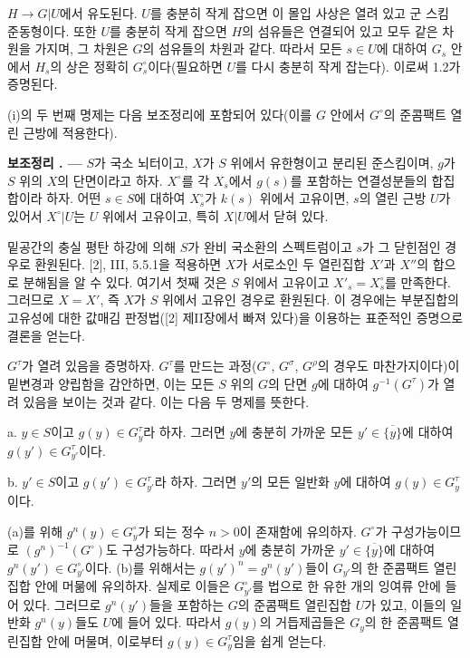\documentclass[11pt,twoside,openany]{book}
\numberwithin{equation}{section}
\newcommand{\sourceunit}{front}
\newcommand{\src}[1]{%
  \phantomsection\hypertarget{src:\sourceunit:#1}{}%
  \marginpar{\raggedleft\footnotesize\sffamily #1}%
}
\theoremstyle{plain}
\theoremstyle{definition}
\theoremstyle{remark}
\newcommand{\result}[2]{%
  \par\medskip\noindent\textbf{#1%
  \if\relax\detokenize{#2}\relax\else\space#2\fi. ---}\enspace
}
\begin{document}
\src{225}
$H\longrightarrow G|U$에서 유도된다. $U$를 충분히 작게 잡으면 이
몰입 사상은 열려 있고 군 스킴 준동형이다. 또한 $U$를 충분히 작게 잡으면
$H$의 섬유들은 연결되어 있고 모두 같은 차원을 가지며, 그 차원은 $G$의
섬유들의 차원과 같다. 따라서 모든 $s\in U$에 대하여 $G_s$ 안에서
$H_s$의 상은 정확히 $G_s^\circ$이다(필요하면 $U$를 다시 충분히 작게
잡는다). 이로써 1.2가 증명된다.

(i)의 두 번째 명제는 다음 보조정리에 포함되어 있다(이를 $G$ 안에서
$G^\circ$의 준콤팩트 열린 근방에 적용한다).

\result{보조정리}{1.3} $S$가 국소 뇌터이고, $X$가 $S$ 위에서 유한형이고
분리된 준스킴이며, $g$가 $S$ 위의 $X$의 단면이라고 하자. $X^\circ$를
각 $X_s$에서 $g(s)$를 포함하는 연결성분들의 합집합이라 하자. 어떤
$s\in S$에 대하여 $X_s^\circ$가 $k(s)$ 위에서 고유이면, $s$의 열린
근방 $U$가 있어서 $X^\circ|U$는 $U$ 위에서 고유이고, 특히 $X|U$에서
닫혀 있다.

밑공간의 충실 평탄 하강에 의해 $S$가 완비 국소환의 스펙트럼이고 $s$가
그 닫힌점인 경우로 환원된다. [2], III, 5.5.1을 적용하면 $X$가 서로소인
두 열린집합 $X'$과 $X''$의 합으로 분해됨을 알 수 있다. 여기서 첫째 것은
$S$ 위에서 고유이고 $X'_s=X_s^\circ$를 만족한다. 그러므로 $X=X'$, 즉
$X$가 $S$ 위에서 고유인 경우로 환원된다. 이 경우에는 부분집합의 고유성에
대한 값매김 판정법([2] 제II장에서 빠져 있다)을 이용하는 표준적인 증명으로
결론을 얻는다.

$G^\tau$가 열려 있음을 증명하자. $G^\tau$를 만드는 과정($G^\circ$,
$G^\sigma$, $G^\rho$의 경우도 마찬가지이다)이 밑변경과 양립함을 감안하면,
이는 모든 $S$ 위의 $G$의 단면 $g$에 대하여 $g^{-1}(G^\tau)$가 열려
있음을 보이는 것과 같다. 이는 다음 두 명제를 뜻한다.

\medskip
\noindent a. $y\in S$이고 $g(y)\in G_y^\tau$라 하자. 그러면
$y$에 충분히 가까운 모든 $y'\in\overline{\{y\}}$에 대하여
$g(y')\in G_{y'}^\tau$이다.

\medskip
\noindent b. $y'\in S$이고 $g(y')\in G_{y'}^\tau$라 하자. 그러면
$y'$의 모든 일반화 $y$에 대하여 $g(y)\in G_y^\tau$이다.

(a)를 위해 $g^n(y)\in G_y^\circ$가 되는 정수 $n>0$이 존재함에 유의하자.
$G^\circ$가 구성가능이므로 $(g^n)^{-1}(G^\circ)$도 구성가능하다. 따라서
$y$에 충분히 가까운 $y'\in\overline{\{y\}}$에 대하여
$g^n(y')\in G_{y'}^\circ$이다. (b)를 위해서는 $g(y')^n=g^n(y')$들이
$G_{y'}$의 한 준콤팩트 열린집합 안에 머묾에 유의하자. 실제로 이들은
$G_{y'}^\circ$를 법으로 한 유한 개의 잉여류 안에 들어 있다. 그러므로
$g^n(y')$들을 포함하는 $G$의 준콤팩트 열린집합 $U$가 있고, 이들의
일반화 $g^n(y)$들도 $U$에 들어 있다. 따라서 $g(y)$의 거듭제곱들은
$G_y$의 한 준콤팩트 열린집합 안에 머물며, 이로부터
$g(y)\in G_y^\tau$임을 쉽게 얻는다.
\end{document}
